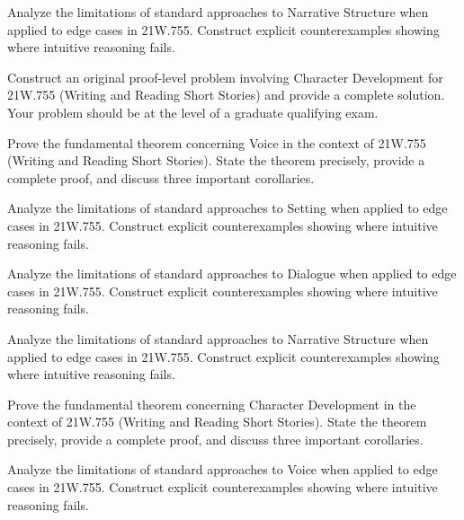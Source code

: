 \documentclass[12pt,a4paper]{exam}
\begin{document}
\begin{questions}

\question[5]
Analyze the limitations of standard approaches to Narrative Structure when applied to edge cases in 21W.755. Construct explicit counterexamples showing where intuitive reasoning fails.

\vspace{0.3cm}

\question[5]
Construct an original proof-level problem involving Character Development for 21W.755 (Writing and Reading Short Stories) and provide a complete solution. Your problem should be at the level of a graduate qualifying exam.

\vspace{0.3cm}

\question[3]
Prove the fundamental theorem concerning Voice in the context of 21W.755 (Writing and Reading Short Stories). State the theorem precisely, provide a complete proof, and discuss three important corollaries.

\vspace{0.3cm}

\question[2]
Analyze the limitations of standard approaches to Setting when applied to edge cases in 21W.755. Construct explicit counterexamples showing where intuitive reasoning fails.

\vspace{0.3cm}

\question[5]
Analyze the limitations of standard approaches to Dialogue when applied to edge cases in 21W.755. Construct explicit counterexamples showing where intuitive reasoning fails.

\vspace{0.3cm}

\question[3]
Analyze the limitations of standard approaches to Narrative Structure when applied to edge cases in 21W.755. Construct explicit counterexamples showing where intuitive reasoning fails.

\vspace{0.3cm}

\question[2]
Prove the fundamental theorem concerning Character Development in the context of 21W.755 (Writing and Reading Short Stories). State the theorem precisely, provide a complete proof, and discuss three important corollaries.

\vspace{0.3cm}

\question[3]
Analyze the limitations of standard approaches to Voice when applied to edge cases in 21W.755. Construct explicit counterexamples showing where intuitive reasoning fails.


\end{questions}
\end{document}
